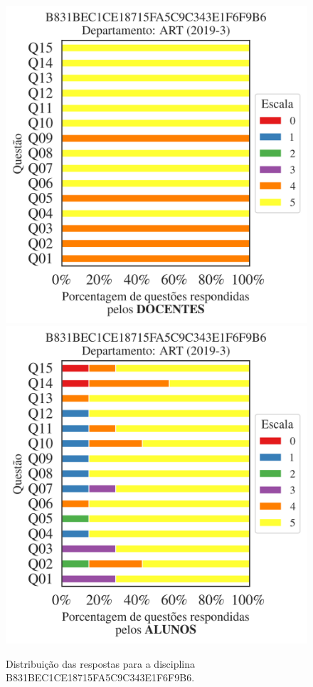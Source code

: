 \documentclass[a4paper,10pt]{article}
\begin{document}
\begin{figure}[h]
\centering
\includegraphics[width=0.485\linewidth]{analise_disciplina_departamento_ART_B831BEC1CE18715FA5C9C343E1F6F9B6_docentes.png}
\includegraphics[width=0.485\linewidth]{analise_disciplina_departamento_ART_B831BEC1CE18715FA5C9C343E1F6F9B6_alunos.png}
\caption{\label{fig:analise_geral_departamento}                Distribuição das respostas para a disciplina B831BEC1CE18715FA5C9C343E1F6F9B6. }
\end{figure}
\end{document}
